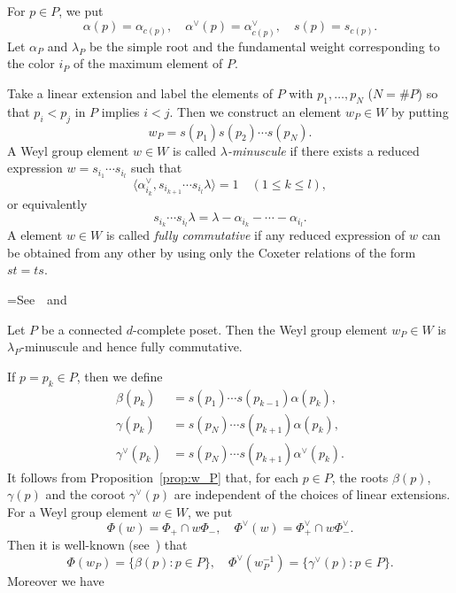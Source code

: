 \documentclass[ALCO,ThmDefs,Unicode,epreuves]{cedram}
\begin{document}
For $p \in P$, we put
$$
\alpha(p) = \alpha_{c(p)},
\quad
\alpha^\vee(p) = \alpha^\vee_{c(p)},
\quad
s(p) = s_{c(p)}.
$$
Let $\alpha_P$ and $\lambda_P$ be the simple root and the fundamental weight 
corresponding to the color $i_P$ of the maximum element of $P$. 

Take a linear extension and label the elements of $P$ with $p_1, \ldots, p_N$ ($N= \# P$) 
so that $p_i < p_j$ in $P$ implies $i<j$.
Then we construct an element $w_P \in W$ by putting
$$
w_P = s(p_1) s(p_2) \cdots s(p_N).
$$
A Weyl group element $w \in W$ is called \emph{$\lambda$-minuscule} 
if there exists a reduced expression $w = s_{i_1} \cdots s_{i_l}$ such that
$$
\langle \alpha^\vee_{i_k}, s_{i_{k+1}} \cdots s_{i_l} \lambda \rangle = 1
\quad(1 \le k \le l),
$$
or equivalently
$$
s_{i_k} \cdots s_{i_l} \lambda = \lambda - \alpha_{i_k} - \cdots - \alpha_{i_l}.
$$
A element $w \in W$ is called \emph{fully commutative} 
if any reduced expression of $w$ can be obtained from any other by using only 
the Coxeter relations of the form $st = ts$.

\setbox\toto=\hbox{See~\cite{Proc2} and~\cite[Proposition~2.1]{Stem2}}
\begin{prop}[\box\toto]
\label{prop:w_P}
Let $P$ be a connected $d$-com\-plete poset.
Then the Weyl group element $w_P \in W$ is $\lambda_P$-minuscule and hence fully commutative.
\end{prop}

If $p = p_k \in P$, then we define 
\begin{align*}
\beta(p_k) &= s(p_1) \cdots s(p_{k-1}) \alpha(p_k),
\\
\gamma(p_k) &= s(p_N) \cdots s(p_{k+1}) \alpha(p_k),
\\
\gamma^\vee(p_k) &= s(p_N) \cdots s(p_{k+1}) \alpha^\vee(p_k).
\end{align*}
It follows from Proposition~\ref{prop:w_P} that, 
for each $p \in P$, the roots $\beta(p)$, $\gamma(p)$ and the coroot $\gamma^\vee(p)$ 
are independent of the choices of linear extensions.
For a Weyl group element $w \in W$, we put
$$
\Phi(w) = \Phi_+ \cap w \Phi_-,
\quad
\Phi^\vee(w) = \Phi^\vee_+ \cap w \Phi^\vee_-.
$$
Then it is well-known (see~\cite[\S~5.6]{H}) that
$$
\Phi(w_P) = \{ \beta(p) : p \in P \},
\quad
\Phi^\vee(w_P^{-1}) = \{ \gamma^\vee(p) : p \in P \}.
$$
Moreover we have
\end{document}
